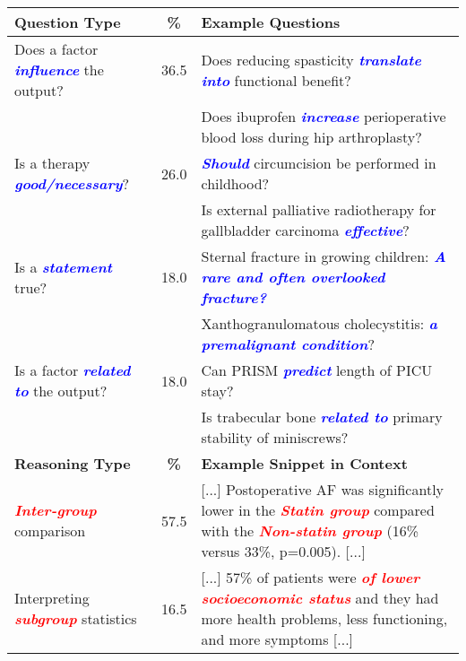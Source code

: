 \documentclass[11pt,a4paper]{article}
\begin{document}
\begin{table*}[!t]
    \centering
    \small
    \begin{tabular}{p{4.6cm}cp{9.5cm}}
        \toprule
        \textbf{Question Type} & \textbf{\%} & \textbf{Example Questions}  \\ 
        \midrule
        Does a factor \textbf{\textit{\textcolor{blue}{influence}}} the output? & 36.5 & Does reducing spasticity \textbf{\textit{\textcolor{blue}{translate into}}} functional benefit? \\
        & & Does ibuprofen \textbf{\textit{\textcolor{blue}{increase}}} perioperative blood loss during hip arthroplasty? \\
        \midrule
        Is a therapy \textbf{\textit{\textcolor{blue}{good/necessary}}}? & 26.0 & \textbf{\textit{\textcolor{blue}{Should}}} circumcision be performed in childhood? \\
        & & Is external palliative radiotherapy for gallbladder carcinoma \textbf{\textit{\textcolor{blue}{effective}}}? \\
        \midrule
        Is a \textbf{\textit{\textcolor{blue}{statement}}} true? & 18.0 & Sternal fracture in growing children: \textbf{\textit{\textcolor{blue}{A rare and often overlooked fracture?}}} \\
        & & Xanthogranulomatous cholecystitis: \textbf{\textit{\textcolor{blue}{a premalignant condition}}}? \\
        \midrule
        Is a factor \textbf{\textit{\textcolor{blue}{related to}}} the output? & 18.0 & Can PRISM \textbf{\textit{\textcolor{blue}{predict}}} length of PICU stay? \\
        & & Is trabecular bone \textbf{\textit{\textcolor{blue}{related to}}} primary stability of miniscrews? \\
        \toprule
        \textbf{Reasoning Type} & \textbf{\%} & \textbf{Example Snippet in Context}  \\
        \midrule
        \textit{\textbf{\textcolor{red}{Inter-group}}} comparison & 57.5 & [...] Postoperative AF was significantly lower in the \textit{\textbf{\textcolor{red}{Statin group}}} compared with the \textit{\textbf{\textcolor{red}{Non-statin group}}} (16\% versus 33\%, p=0.005). [...] \\
        \midrule
        Interpreting \textit{\textbf{\textcolor{red}{subgroup}}} statistics & 16.5 & [...] 57\% of patients were \textit{\textbf{\textcolor{red}{of lower socioeconomic status}}} and they had more health problems, less functioning, and more symptoms [...] \\

\end{tabular}
\end{table*}
\end{document}
